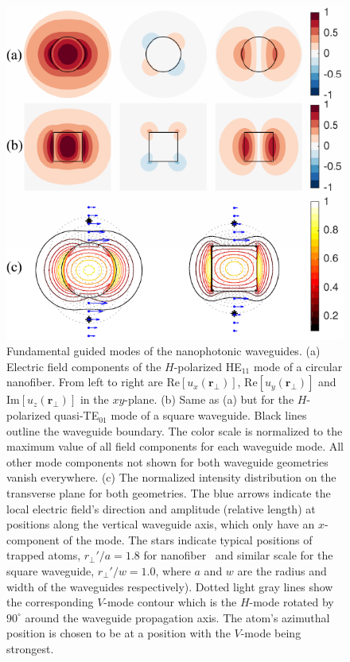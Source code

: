 \documentclass[preprint,aps,pra,onecolumn,superscriptaddress]{revtex4-1} %
\def\br{\mathbf{r}}
\newcommand{\SWG}{square waveguide\xspace}%
\begin{document}
\begin{figure}[htb]
\centering
  \includegraphics[width=.49\textwidth]{fig/nanofiberswg_Hmode6}
  \caption{Fundamental guided modes of the nanophotonic waveguides. (a) Electric field components of the $H$-polarized HE$_{11}$ mode of a circular nanofiber. From left to right are $ \mathrm{Re}[u_x(\br\!_\perp)] $, $ \mathrm{Re}[u_y(\br\!_\perp)] $ and $ \mathrm{Im}[u_z(\br\!_\perp)] $ in the $ xy $-plane. (b) Same as (a) but for  the $H$-polarized quasi-TE$_{01}$ mode of a square waveguide. Black lines outline the waveguide boundary. The color scale is normalized to the maximum value of all field components for each waveguide mode. All other mode components not shown for both waveguide geometries vanish everywhere. (c) The normalized intensity distribution on the transverse plane for both geometries. The blue arrows indicate the local electric field's direction and amplitude (relative length) at positions along the vertical waveguide axis, which only have an $ x $-component of the mode. The stars indicate typical positions of trapped atoms, $r_\perp'/a=1.8  $ for nanofiber~\cite{Vetsch2010Optical} and similar scale for the \SWG,  $ r_\perp'/w=1.0 $, where $ a $ and $ w $ are the radius and width of the waveguides respectively). Dotted light gray lines show the corresponding $ V $-mode contour which is the $ H $-mode rotated by $ 90^\circ $ around the waveguide propagation axis. The atom's azimuthal position is chosen to be at a position with the $V$-mode being strongest. }\label{fig:nanofiberSWG_E_ints}
\end{figure}
\end{document}
